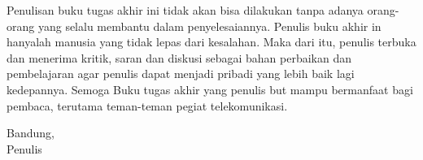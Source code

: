 Penulisan buku tugas akhir ini tidak akan bisa dilakukan tanpa adanya orang-orang
yang selalu membantu dalam penyelesaiannya. Penulis buku akhir in hanyalah
manusia yang tidak lepas dari kesalahan. Maka dari itu, penulis terbuka dan
menerima kritik, saran dan diskusi sebagai bahan perbaikan dan pembelajaran agar
penulis dapat menjadi pribadi yang lebih baik lagi kedepannya. Semoga Buku tugas
akhir yang penulis but mampu bermanfaat bagi pembaca, terutama teman-teman
pegiat telekomunikasi.

Bandung, \thedate \\[\baselineskip]
Penulis